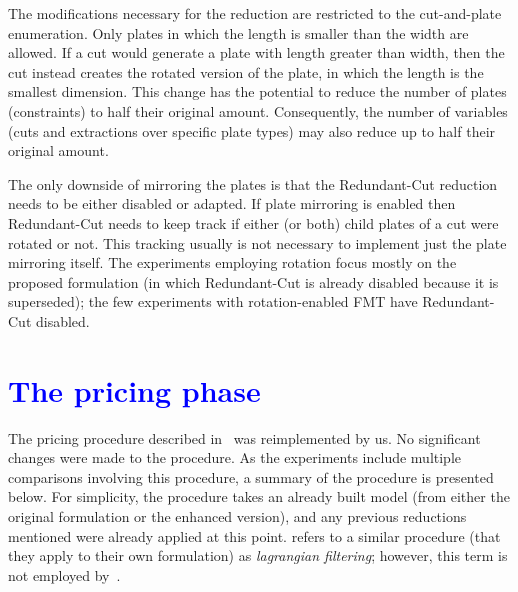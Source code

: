 \documentclass[ppgc,tese,english,formais,babel]{iiufrgs}
\newif\iffinalversion
\newcommand{\newtext}[1]{\iffinalversion%
#1%
\else%
\textcolor{blue}{#1}%
\fi%
}
\begin{document}
The modifications necessary for the reduction are restricted to the cut-and-plate enumeration.
Only plates in which the length is smaller than the width are allowed.
If a cut would generate a plate with length greater than width, then the cut instead creates the rotated version of the plate, in which the length is the smallest dimension.
This change has the potential to reduce the number of plates (constraints) to half their original amount.
Consequently, the number of variables (cuts and extractions over specific plate types) may also reduce up to half their original amount.

The only downside of mirroring the plates is that the Redundant-Cut reduction needs to be either disabled or adapted.
If plate mirroring is enabled then Redundant-Cut needs to keep track if either (or both) child plates of a cut were rotated or not.
This tracking usually is not necessary to implement just the plate mirroring itself.
The experiments employing rotation focus mostly on the proposed formulation (in which Redundant-Cut is already disabled because it is superseded); the few experiments with rotation-enabled FMT have Redundant-Cut disabled.

\section{\newtext{The pricing phase}}
\label{sec:pricing}

The pricing procedure described in~\citet{furini:2016,dimitri_thesis} was reimplemented by us.
No significant changes were made to the procedure.
As the experiments include multiple comparisons involving this procedure, a summary of the procedure is presented below.
For simplicity, the procedure takes an already built model (from either the original formulation or the enhanced version), and any previous reductions mentioned were already applied at this point.
\citet{clautiaux:2018} refers to a similar procedure (that they apply to their own formulation) as \emph{lagrangian filtering}; however, this term is not employed by~\citet{furini:2016,dimitri_thesis}.
\end{document}
